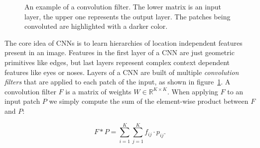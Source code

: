 \begin{figure}[h]
\begin{subfigure}[b]{0.24\textwidth}
  \end{subfigure}  
  \caption{An example of a convolution filter. The lower matrix is an input layer, the upper one represents the output layer. The patches being convoluted are highlighted with a darker color.}
  \label{fig:conv_no_padding_no_strides}
\end{figure}

The core idea of CNNs is to learn hierarchies of location independent features present in an image. Features in the first layer of a CNN are just geometric primitives like edges, but last layers represent complex context dependent features like eyes or noses. Layers of a CNN are built of multiple \textit{convolution filters} that are applied to each patch of the input, as shown in figure~\ref{fig:conv_no_padding_no_strides}. A convolution filter $F$ is a matrix of weights $W \in \mathbb{R}^{K \times K}$. When applying $F$ to an input patch $P$ we simply compute the sum of the element-wise product between $F$ and $P$:

\begin{equation}
	F * P  = \sum_{i=1}^K \sum_{j=1}^K f_{ij} \cdot p_{ij}.
\end{equation}

